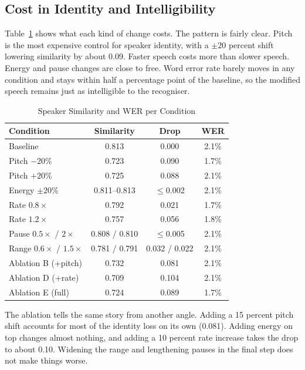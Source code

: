 \documentclass[conference]{IEEEtran}
\begin{document}
\subsection{Cost in Identity and Intelligibility}
Table~\ref{tab:cost} shows what each kind of change costs. The pattern is fairly clear. Pitch is
the most expensive control for speaker identity, with a $\pm 20$ percent shift lowering similarity
by about 0.09. Faster speech costs more than slower speech. Energy and pause changes are close to
free. Word error rate barely moves in any condition and stays within half a percentage point of the
baseline, so the modified speech remains just as intelligible to the recogniser.

\begin{table}[htbp]
\caption{Speaker Similarity and WER per Condition}
\begin{center}
\begin{tabular}{|l|c|c|c|}
\hline
\textbf{Condition} & \textbf{Similarity} & \textbf{Drop} & \textbf{WER} \\
\hline
Baseline & 0.813 & 0.000 & 2.1\% \\
Pitch $-20$\% & 0.723 & 0.090 & 1.7\% \\
Pitch $+20$\% & 0.725 & 0.088 & 2.1\% \\
Energy $\pm 20$\% & 0.811--0.813 & $\le$0.002 & 2.1\% \\
Rate $0.8\times$ & 0.792 & 0.021 & 1.7\% \\
Rate $1.2\times$ & 0.757 & 0.056 & 1.8\% \\
Pause $0.5\times$ / $2\times$ & 0.808 / 0.810 & $\le$0.005 & 2.1\% \\
Range $0.6\times$ / $1.5\times$ & 0.781 / 0.791 & 0.032 / 0.022 & 2.1\% \\
\hline
Ablation B (+pitch) & 0.732 & 0.081 & 2.1\% \\
Ablation D (+rate) & 0.709 & 0.104 & 2.1\% \\
Ablation E (full) & 0.724 & 0.089 & 1.7\% \\
\hline
\end{tabular}
\label{tab:cost}
\end{center}
\end{table}

The ablation tells the same story from another angle. Adding a 15 percent pitch shift accounts for
most of the identity loss on its own (0.081). Adding energy on top changes almost nothing, and
adding a 10 percent rate increase takes the drop to about 0.10. Widening the range and lengthening
pauses in the final step does not make things worse.
\end{document}
